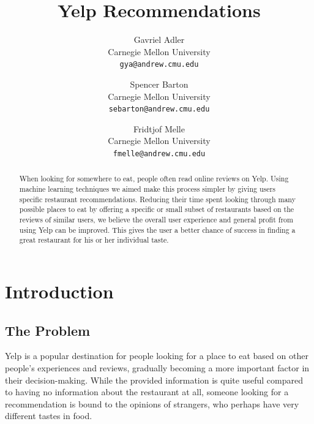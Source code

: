 \documentclass[10pt,twocolumn,letterpaper]{article}
\begin{document}
\title{Yelp Recommendations}

\author{
Gavriel Adler\\
Carnegie Mellon University\\
{\tt\small gya@andrew.cmu.edu}
\and
Spencer Barton\\
Carnegie Mellon University\\
{\tt\small sebarton@andrew.cmu.edu}
\and
Fridtjof Melle\\
Carnegie Mellon University\\
{\tt\small fmelle@andrew.cmu.edu}
}

\maketitle

\begin{abstract}
   When looking for somewhere to eat, people often read online reviews on Yelp. Using machine learning techniques we aimed make this process simpler by giving users specific restaurant recommendations. Reducing their time spent looking through many possible places to eat by offering a specific or small subset of restaurants based on the reviews of similar users, we believe the overall user experience and general profit from using Yelp can be improved. This gives the user a better chance of success in finding a great restaurant for his or her individual taste.

   
\end{abstract}

\section{Introduction}

\subsection{The Problem}
Yelp is a popular destination for people looking for a place to eat based on other people's experiences and reviews, gradually becoming a more important factor in their decision-making. While the provided information is quite useful compared to having no information about the restaurant at all, someone looking for a recommendation is bound to the opinions of strangers, who perhaps have very different tastes in food.
\end{document}
